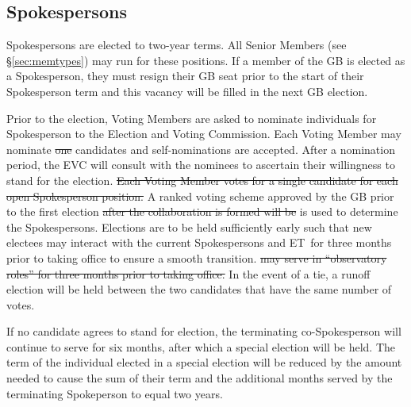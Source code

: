 \documentclass[12pt]{article}
\newcommand{\exec}{{Executive Team}}
\newcommand{\shorte}{{ET}}  %
\begin{document}
\subsection{Spokespersons}

Spokespersons are elected to two-year terms. All Senior Members (see \S\ref{sec:memtypes}) may  run for these positions.  %
If a member of the GB is elected as a Spokesperson, they must resign their GB seat prior to the start of their Spokesperson term and this vacancy will be filled in the next GB election. 

Prior to the election, Voting Members are asked to nominate individuals for Spokesperson to the Election and Voting Commission. Each Voting Member may nominate {\color{red} \sout{one}} candidates and self-nominations are accepted. %
After a nomination period, the EVC will consult with the nominees to ascertain their willingness to stand for the election.
{\color{red} \sout{Each Voting Member votes for a single candidate for each open Spokesperson position.} A ranked voting scheme approved by the GB prior to the first election \sout{after the collaboration is formed will be} is used to determine the Spokespersons. Elections are to be held sufficiently early such that new electees may interact with the current Spokespersons and \shorte\ for three months prior to taking office to ensure a smooth transition. \sout{may serve in ``observatory roles'' for three months prior to taking office.}}
In the event of a tie, a runoff election will be held between the two candidates that have the same number of votes. 


If no candidate agrees to stand for election, the terminating co-Spokesperson will continue to serve for six months, after which a special election will be held. The term of the individual elected in a special election will be reduced by the amount needed to cause the sum of their term and the additional months served by the terminating Spokeperson to equal two years.
\end{document}
